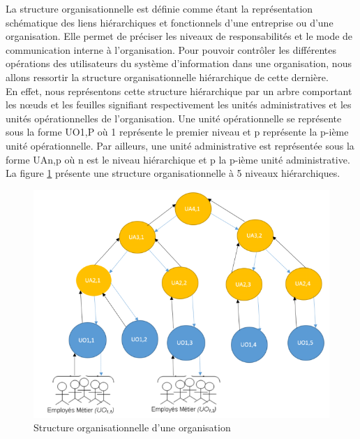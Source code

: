 \label{sectionStructureOrg}

La structure organisationnelle est définie comme étant la représentation schématique des liens hiérarchiques et fonctionnels d'une entreprise ou d'une organisation. Elle permet de préciser les niveaux de responsabilités et le mode de communication interne à l'organisation. Pour pouvoir contrôler les différentes opérations des utilisateurs du système d'information dans une organisation, nous allons ressortir la structure organisationnelle hiérarchique de cette dernière.\\
\hspace*{0.5cm} En effet, nous représentons cette structure hiérarchique par un arbre comportant les nœuds et les feuilles signifiant respectivement les unités administratives et les unités opérationnelles de l'organisation. Une unité opérationnelle se représente sous la forme UO1,P où 1 représente le premier niveau et p représente la p-ième unité opérationnelle. Par ailleurs, une unité administrative est représentée sous la forme UAn,p où n est le niveau hiérarchique et p la p-ième unité administrative. La figure \ref{figstructure} présente une structure organisationnelle à 5 niveaux hiérarchiques.

\begin{figure}[h!]
    \centering
		\includegraphics[scale=0.7]{chap3/images/structureorg.png}
    \caption{Structure organisationnelle d'une organisation}
	 \label{figstructure}
\end{figure} 

\label{sectionContexte}

